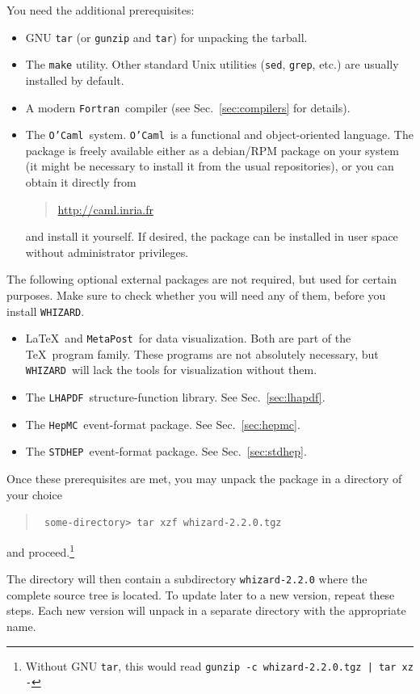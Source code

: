 \documentclass[12pt]{book}
\newcommand{\ttt}[1]{\texttt{#1}}
\newcommand{\whizard}{\texttt{WHIZARD}}
\newcommand{\stdhep}{\texttt{STDHEP}}
\newcommand{\lhapdf}{\texttt{LHAPDF}}
\newcommand{\hepmc}{\texttt{HepMC}}
\newcommand{\metapost}{\texttt{MetaPost}}
\newcommand{\fortran}{\texttt{Fortran}}
\newcommand{\ocaml}{\texttt{O'Caml}}
\newcommand{\thisversion}{2.2.0}
\begin{document}
You need the additional prerequisites:
\begin{itemize}
\item
  GNU \ttt{tar} (or \ttt{gunzip} and \ttt{tar}) for unpacking the
  tarball.
\item
  The \ttt{make} utility.  Other standard Unix utilities (\ttt{sed},
  \ttt{grep}, etc.) are usually installed by default.
\item
  A modern \fortran\ compiler (see Sec.~\ref{sec:compilers} for
  details).
\item
  The \ocaml\ system.  \ocaml\ is a functional and object-oriented
  language.  The package is freely available either as a debian/RPM package
  on your system (it might be necessary to install it from the usual
  repositories), or you can obtain it directly from
  \begin{quote}
    \url{http://caml.inria.fr}
  \end{quote}
  and install it yourself.  If desired, the package can be installed
  in user space without administrator privileges.
\end{itemize}
The following optional external packages are not required, but used
for certain purposes.  Make sure to check whether you will need any of
them, before you install \whizard.
\begin{itemize}
\item
  \LaTeX\ and \metapost\ for data visualization.  Both are part of the
  \TeX\ program family.  These programs are not absolutely necessary,
  but \whizard\ will lack the tools for visualization without them.
\item
  The \lhapdf\ structure-function library.  See
  Sec.~\ref{sec:lhapdf}.
\item
  The \hepmc\ event-format package.  See Sec.~\ref{sec:hepmc}.
\item
  The \stdhep\ event-format package.  See Sec.~\ref{sec:stdhep}.
\end{itemize}
Once these prerequisites are met, you may unpack the package in a
directory of your choice
\begin{quote}\small\tt
  some-directory> tar xzf whizard-\thisversion.tgz
\end{quote}
and proceed.\footnote{Without GNU \ttt{tar}, this would read \ttt{\small gunzip -c whizard-\thisversion.tgz | tar xz -}}

The directory will then contain a subdirectory \ttt{whizard-\thisversion}
where the complete source tree is located.  To update later to a new
version, repeat these steps.  Each new version will unpack in a
separate directory with the appropriate name.
\end{document}
